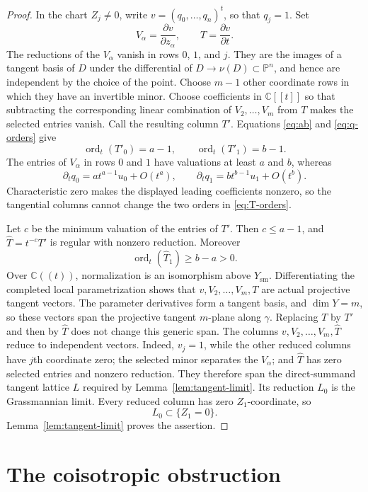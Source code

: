\documentclass[11pt]{amsart}
\theoremstyle{definition}
\begin{document}
\begin{proof}
In the chart $Z_j\neq0$, write $v=(q_0,\ldots,q_n)^t$, so that $q_j=1$.
Set
\[
 V_\alpha=\frac{\partial v}{\partial z_\alpha},\qquad
 T=\frac{\partial v}{\partial t}.
\]
The reductions of the $V_\alpha$ vanish in rows $0$, $1$, and $j$. They are
the images of a tangent basis of $D$ under the differential of
$D\to\nu(D)\subset\mathbb P^n$, and hence are independent by the choice of
the point. Choose $m-1$ other coordinate rows in which they have an
invertible minor. Choose
coefficients in $\mathbb C[[t]]$ so that subtracting the
corresponding linear combination of $V_2,\ldots,V_m$ from $T$ makes the
selected entries vanish. Call the resulting column $T'$. Equations
\eqref{eq:ab} and \eqref{eq:q-orders} give
\[
 \operatorname{ord}_t(T'_0)=a-1,\qquad
 \operatorname{ord}_t(T'_1)=b-1.
 \tag{4.3}\label{eq:T-orders}
\]
The entries of $V_\alpha$ in rows $0$ and $1$ have valuations at least $a$
and $b$, whereas
\[
 \partial_tq_0=a t^{a-1}u_0+O(t^a),\qquad
 \partial_tq_1=b t^{b-1}u_1+O(t^b).
\]
Characteristic zero makes the displayed leading coefficients nonzero, so the
tangential columns cannot change the two orders in \eqref{eq:T-orders}.

Let $c$ be the minimum valuation of the entries of $T'$. Then $c\leq a-1$,
and $\widehat T=t^{-c}T'$ is regular with nonzero reduction. Moreover
\[
 \operatorname{ord}_t(\widehat T_1)\geq b-a>0.
 \tag{4.4}\label{eq:T1-vanish}
\]
Over $\mathbb C((t))$, normalization is an isomorphism above
$Y_{\mathrm{sm}}$. Differentiating the completed local parametrization shows
that $v,V_2,\ldots,V_m,T$ are actual projective tangent vectors. The parameter
derivatives form a tangent basis, and $\dim Y=m$, so these vectors span the
projective tangent $m$-plane along $\gamma$. Replacing $T$ by $T'$ and then by
$\widehat T$ does not change this generic span. The columns
$v,V_2,\ldots,V_m,\widehat T$ reduce to independent vectors. Indeed,
$v_j=1$, while the other reduced columns have $j$th coordinate zero; the
selected minor separates the $V_\alpha$; and $\widehat T$ has zero selected
entries and nonzero reduction. They therefore span the direct-summand tangent
lattice $L$ required by Lemma~\ref{lem:tangent-limit}.
Its reduction $L_0$ is the Grassmannian limit. Every reduced column
has zero $Z_1$-coordinate, so
\[
 L_0\subset\{Z_1=0\}.
\]
Lemma~\ref{lem:tangent-limit} proves the assertion.
\end{proof}

\section{The coisotropic obstruction}
\end{document}
